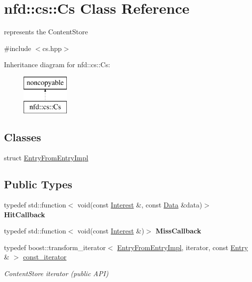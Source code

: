\hypertarget{classnfd_1_1cs_1_1Cs}{}\section{nfd\+:\+:cs\+:\+:Cs Class Reference}
\label{classnfd_1_1cs_1_1Cs}


represents the Content\+Store  




{\ttfamily \#include $<$cs.\+hpp$>$}

Inheritance diagram for nfd\+:\+:cs\+:\+:Cs\+:\begin{figure}[H]
\begin{center}
\leavevmode
\includegraphics[height=2.000000cm]{classnfd_1_1cs_1_1Cs}
\end{center}
\end{figure}
\subsection*{Classes}
\begin{DoxyCompactItemize}
\item 
struct \hyperlink{structnfd_1_1cs_1_1Cs_1_1EntryFromEntryImpl}{Entry\+From\+Entry\+Impl}
\end{DoxyCompactItemize}
\subsection*{Public Types}
\begin{DoxyCompactItemize}
\item 
typedef std\+::function$<$ void(const \hyperlink{classndn_1_1Interest}{Interest} \&, const \hyperlink{classndn_1_1Data}{Data} \&data)$>$ {\bfseries Hit\+Callback}\hypertarget{classnfd_1_1cs_1_1Cs_a573a36f89c522f5c2741a041de422203}{}\label{classnfd_1_1cs_1_1Cs_a573a36f89c522f5c2741a041de422203}

\item 
typedef std\+::function$<$ void(const \hyperlink{classndn_1_1Interest}{Interest} \&)$>$ {\bfseries Miss\+Callback}\hypertarget{classnfd_1_1cs_1_1Cs_a0796d1b69145688ce47867dc8e7de050}{}\label{classnfd_1_1cs_1_1Cs_a0796d1b69145688ce47867dc8e7de050}

\item 
typedef boost\+::transform\+\_\+iterator$<$ \hyperlink{structnfd_1_1cs_1_1Cs_1_1EntryFromEntryImpl}{Entry\+From\+Entry\+Impl}, iterator, const \hyperlink{classnfd_1_1cs_1_1Entry}{Entry} \& $>$ \hyperlink{classnfd_1_1cs_1_1Cs_a59777b86bdfb8755c9e0429fb1317a1d}{const\+\_\+iterator}\hypertarget{classnfd_1_1cs_1_1Cs_a59777b86bdfb8755c9e0429fb1317a1d}{}\label{classnfd_1_1cs_1_1Cs_a59777b86bdfb8755c9e0429fb1317a1d}

\begin{DoxyCompactList}\small\item\em Content\+Store iterator (public A\+PI) \end{DoxyCompactList}\end{DoxyCompactItemize}
